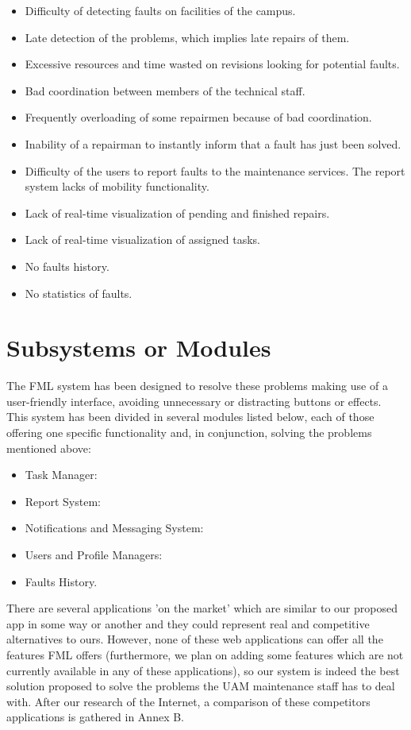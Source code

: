 \documentclass{report}
\begin{document}
\begin{itemize}
\item Difficulty of detecting faults on facilities of the campus.
\item Late detection of the problems, which implies late repairs of them.
\item Excessive resources and time wasted on revisions looking for potential faults.
\item Bad coordination between members of the technical staff.
\item Frequently overloading of some repairmen because of bad coordination.
\item Inability of a repairman to instantly inform that a fault has just been solved.
\item Difficulty of the users to report faults to the maintenance services.
The report system lacks of mobility functionality.
\item Lack of real-time visualization of pending and finished repairs.
\item Lack of real-time visualization of assigned tasks.
\item No faults history.
\item No statistics of faults.
\end{itemize}

\section{Subsystems or Modules}

The FML system has been designed to resolve these problems making use of a user-friendly interface, avoiding unnecessary or distracting buttons or effects. This system has been divided in several modules listed below, each of those offering one specific functionality and, in conjunction, solving the problems mentioned above:
\begin{itemize}
\item Task Manager:
\item Report System:
\item Notifications and Messaging System:
\item Users and Profile Managers:
\item Faults History.
\end{itemize}

There are several applications 'on the market' which are similar to our proposed app in some way or another and they could represent real and competitive alternatives to ours. However, none of these web applications can offer all the features FML offers (furthermore, we plan on adding some features which are not currently available in any of these applications), so our system is indeed the best solution proposed to solve the problems the UAM maintenance staff has to deal with. After our research of the Internet, a comparison of these competitors applications is gathered in Annex B.
\end{document}
